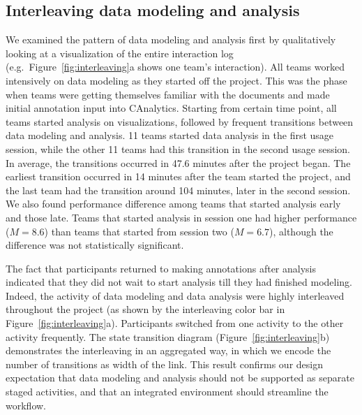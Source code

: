 \subsection{Interleaving data modeling and analysis}\label{interleaving-data-modeling-and-data-analysis}



We examined the pattern of data modeling and analysis first by
qualitatively looking at a visualization of the entire interaction log
(e.g.~Figure~\ref{fig:interleaving}a shows one team's interaction). All teams
worked intensively on data modeling as they started off the project.
This was the phase when teams were getting themselves familiar with the
documents and made initial annotation input into CAnalytics. Starting from certain
time point, all teams started analysis on visualizations,
followed by frequent transitions between data modeling and analysis. 11
teams started data analysis in the first usage session, while the other
11 teams had this transition in the second usage session. In average,
the transitions occurred in 47.6 minutes after the project began. The earliest transition occurred in 14 minutes after the team started the project, and the last team
had the transition around 104 minutes, later in the second session. We
also found performance difference among teams that started analysis
early and those late. Teams that started analysis in session one had
higher performance ($M=8.6$) than teams that started from session two
($M=6.7$), although the difference was not statistically significant.

The fact that participants returned to making annotations after analysis
indicated that they did not wait to start analysis till they had
finished modeling. Indeed, the activity of data modeling and data
analysis were highly interleaved throughout the project (as shown by the interleaving color bar in Figure~\ref{fig:interleaving}a). Participants switched from
one activity to the other activity frequently. The state transition
diagram (Figure~\ref{fig:interleaving}b) demonstrates the interleaving in an aggregated way, in which we
encode the number of transitions as width of the link. This result
confirms our design expectation that data modeling and analysis should
not be supported as separate staged activities, and that an integrated
environment should streamline the workflow.

